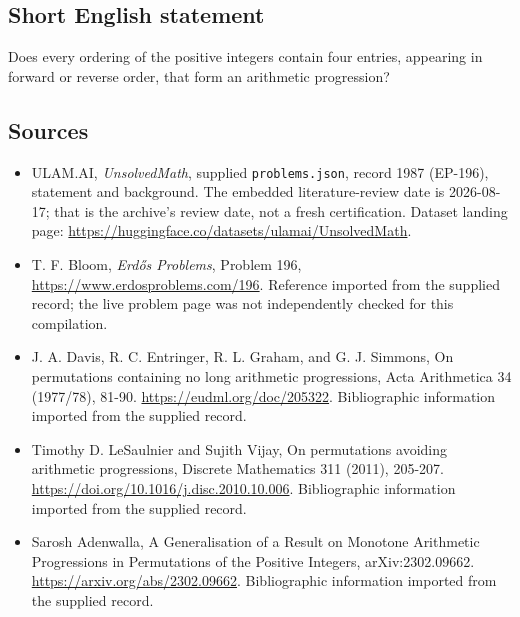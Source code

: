 \documentclass[11pt,a4paper]{article}
\begin{document}
\subsection{Short English statement}

Does every ordering of the positive integers contain four entries, appearing in forward or reverse order, that form an arithmetic progression?

\subsection{Sources}

{\small

\begin{itemize}

\item[\hypertarget{source:1987:1}{S1}] ULAM.AI, \emph{UnsolvedMath}, supplied \texttt{problems.json}, record 1987 (EP-196), statement and background. The embedded literature-review date is 2026-08-17; that is the archive’s review date, not a fresh certification. Dataset landing page: \url{https://huggingface.co/datasets/ulamai/UnsolvedMath}.

\item[\hypertarget{source:1987:2}{S2}] T. F. Bloom, \emph{Erdős Problems}, Problem 196, \url{https://www.erdosproblems.com/196}. Reference imported from the supplied record; the live problem page was not independently checked for this compilation.

\item[\hypertarget{source:1987:3}{S3}] J. A. Davis, R. C. Entringer, R. L. Graham, and G. J. Simmons, On permutations containing no long arithmetic progressions, Acta Arithmetica 34 (1977/78), 81-90. \url{https://eudml.org/doc/205322}. Bibliographic information imported from the supplied record.

\item[\hypertarget{source:1987:4}{S4}] Timothy D. LeSaulnier and Sujith Vijay, On permutations avoiding arithmetic progressions, Discrete Mathematics 311 (2011), 205-207. \url{https://doi.org/10.1016/j.disc.2010.10.006}. Bibliographic information imported from the supplied record.

\item[\hypertarget{source:1987:5}{S5}] Sarosh Adenwalla, A Generalisation of a Result on Monotone Arithmetic Progressions in Permutations of the Positive Integers, arXiv:2302.09662. \url{https://arxiv.org/abs/2302.09662}. Bibliographic information imported from the supplied record.

\end{itemize}

}

\label{end:1987}
\end{document}
